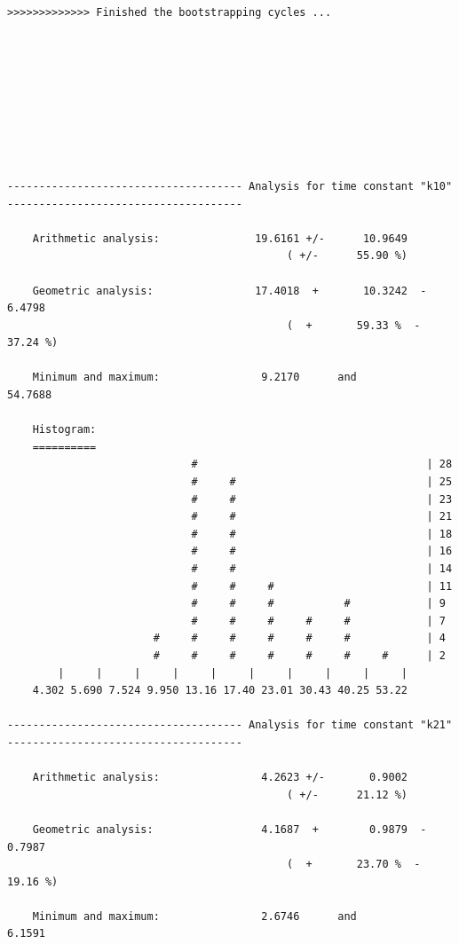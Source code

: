 \documentclass[a4paper,11pt,DIV=15,openany]{scrbook}
\begin{document}
\begin{oframed}
\begin{Verbatim}[commandchars=\\\{\}]
>>>>>>>>>>>>> Finished the bootstrapping cycles ...









------------------------------------- Analysis for time constant "k10" -------------------------------------

    Arithmetic analysis:               19.6161 +/-      10.9649
                                            ( +/-      55.90 %)

    Geometric analysis:                17.4018  +       10.3242  -        6.4798
                                            (  +       59.33 %  -       37.24 %)

    Minimum and maximum:                9.2170      and            54.7688

    Histogram:
    ==========
                             #                                    | 28
                             #     #                              | 25
                             #     #                              | 23
                             #     #                              | 21
                             #     #                              | 18
                             #     #                              | 16
                             #     #                              | 14
                             #     #     #                        | 11
                             #     #     #           #            | 9
                             #     #     #     #     #            | 7
                       #     #     #     #     #     #            | 4
                       #     #     #     #     #     #     #      | 2
        |     |     |     |     |     |     |     |     |     |  
    4.302 5.690 7.524 9.950 13.16 17.40 23.01 30.43 40.25 53.22

------------------------------------- Analysis for time constant "k21" -------------------------------------

    Arithmetic analysis:                4.2623 +/-       0.9002
                                            ( +/-      21.12 %)

    Geometric analysis:                 4.1687  +        0.9879  -        0.7987
                                            (  +       23.70 %  -       19.16 %)

    Minimum and maximum:                2.6746      and             6.1591


\end{Verbatim}
\end{oframed}
\end{document}
